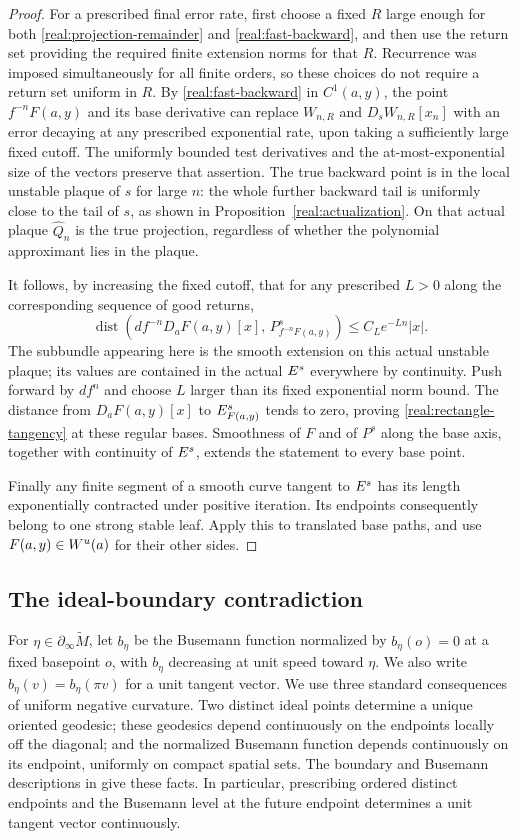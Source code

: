 \begin{proof}
For a prescribed final error rate, first choose a fixed $R$ large
enough for both \eqref{real:projection-remainder} and
\eqref{real:fast-backward}, and then use the return set providing
the required finite extension norms for that $R$. Recurrence was
imposed simultaneously for all finite orders, so these choices do
not require a return set uniform in $R$.
By \eqref{real:fast-backward} in $C^1(a,y)$, the point
$f^{-n}F(a,y)$ and its base derivative can replace $W_{n,R}$ and
$D_sW_{n,R}[x_n]$ with an error decaying at any prescribed
exponential rate, upon taking a sufficiently large fixed cutoff.
The uniformly bounded test derivatives and the at-most-exponential
size of the vectors preserve that assertion. The true backward
point is in the local unstable plaque of $s$ for large $n$: the
whole further backward tail is uniformly close to the tail of $s$,
as shown in Proposition~\ref{real:actualization}. On that actual
plaque $\widehat Q_n$ is the true projection, regardless of
whether the polynomial approximant lies in the plaque.

It follows, by increasing the fixed cutoff, that for any prescribed
$L>0$ along the corresponding sequence of good returns,
\[
 \operatorname{dist}\left(
   df^{-n}D_aF(a,y)[x],\,
   P^s_{f^{-n}F(a,y)}\right)
       \le C_L e^{-Ln}|x|.
\]
The subbundle appearing here is the smooth extension on this
actual unstable plaque; its values are contained in the actual
$E^s$ everywhere by continuity. Push forward by $df^n$ and
choose $L$ larger than its fixed exponential norm bound. The
distance from $D_aF(a,y)[x]$ to $E^s_{F(a,y)}$ tends to zero,
proving \eqref{real:rectangle-tangency} at these regular bases.
Smoothness of $F$ and of $P^s$ along the base axis, together with
continuity of $E^s$, extends the statement to every base point.

Finally any finite segment of a smooth curve tangent to $E^s$
has its length exponentially contracted under positive iteration.
Its endpoints consequently belong to one strong stable leaf.
Apply this to translated base paths, and use
$F(a,y)\in W^u(a)$ for their other sides.
\end{proof}

\subsection{The ideal-boundary contradiction}

For $\eta\in\partial_\infty\widetilde M$, let $b_\eta$ be the
Busemann function normalized by $b_\eta(o)=0$ at a fixed basepoint
$o$, with $b_\eta$ decreasing at unit speed toward $\eta$.
We also write $b_\eta(v)=b_\eta(\pi v)$ for a unit tangent vector.
We use three standard consequences of uniform negative curvature.
Two distinct ideal points determine a unique oriented geodesic;
these geodesics depend continuously on the endpoints locally off
the diagonal; and the normalized Busemann function depends
continuously on its endpoint, uniformly on compact spatial sets.
The boundary and Busemann descriptions in
\citet[Chapters II and III, especially Lemma III.3.1]{Ballmann1995}
give these facts. In particular, prescribing ordered distinct
endpoints and the Busemann level at the future endpoint determines
a unit tangent vector continuously.


